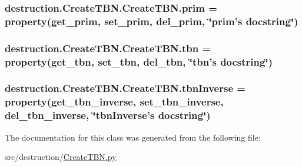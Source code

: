 \hypertarget{classdestruction_1_1_create_t_b_n_1_1_create_t_b_n_a8e10ba26232efb708be76c3d6487fd09}{
\subsubsection[{prim}]{\setlength{\rightskip}{0pt plus 5cm}destruction.\-Create\-T\-B\-N.\-Create\-T\-B\-N.\-prim = property({\bf get\-\_\-prim}, {\bf set\-\_\-prim}, {\bf del\-\_\-prim}, \char`\"{}prim's docstring\char`\"{})\hspace{0.3cm}{\ttfamily [static]}}}\label{classdestruction_1_1_create_t_b_n_1_1_create_t_b_n_a8e10ba26232efb708be76c3d6487fd09}
\hypertarget{classdestruction_1_1_create_t_b_n_1_1_create_t_b_n_aa44fc92977c3cf7ba557a28f12b6f838}{
\subsubsection[{tbn}]{\setlength{\rightskip}{0pt plus 5cm}destruction.\-Create\-T\-B\-N.\-Create\-T\-B\-N.\-tbn = property({\bf get\-\_\-tbn}, {\bf set\-\_\-tbn}, {\bf del\-\_\-tbn}, \char`\"{}tbn's docstring\char`\"{})\hspace{0.3cm}{\ttfamily [static]}}}\label{classdestruction_1_1_create_t_b_n_1_1_create_t_b_n_aa44fc92977c3cf7ba557a28f12b6f838}
\hypertarget{classdestruction_1_1_create_t_b_n_1_1_create_t_b_n_ab55311957758a6665a2d217f796fcfac}{
\subsubsection[{tbn\-Inverse}]{\setlength{\rightskip}{0pt plus 5cm}destruction.\-Create\-T\-B\-N.\-Create\-T\-B\-N.\-tbn\-Inverse = property({\bf get\-\_\-tbn\-\_\-inverse}, {\bf set\-\_\-tbn\-\_\-inverse}, {\bf del\-\_\-tbn\-\_\-inverse}, \char`\"{}tbn\-Inverse's docstring\char`\"{})\hspace{0.3cm}{\ttfamily [static]}}}\label{classdestruction_1_1_create_t_b_n_1_1_create_t_b_n_ab55311957758a6665a2d217f796fcfac}


The documentation for this class was generated from the following file\-:\begin{DoxyCompactItemize}
\item 
src/destruction/\hyperlink{_create_t_b_n_8py}{Create\-T\-B\-N.\-py}\end{DoxyCompactItemize}
